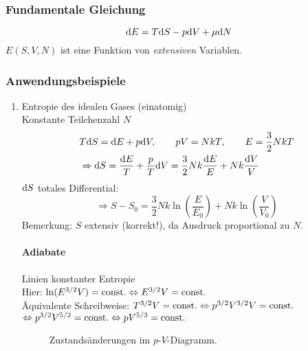 \subsubsection{Fundamentale Gleichung}
\begin{equation}
    \label{eq:fundamentalEQ}
    \mathrm{d} E = T \mathrm{d} S - p \mathrm{d} V + \mu \mathrm{d} N
\end{equation}
$E(S, V, N)$ ist eine Funktion von \emph{extensiven} Variablen.

\subsubsection{Anwendungsbeispiele}
\begin{enumerate}
    \item Entropie des idealen Gases (einatomig) \\
    Konstante Teilchenzahl $N$
    \begin{equation}
        \begin{split}
            & T \mathrm{d} S = \mathrm{d} E + p \mathrm{d} V, \qquad p V = N k T, \qquad E = \frac{3}{2} N k T \\
            & \Rightarrow \mathrm{d} S = \frac{\mathrm{d} E}{T} + \frac{p}{T} \mathrm{d} V = \frac{3}{2} N k \frac{\mathrm{d} E}{E} + N k \frac{\mathrm{d} V}{V}
        \end{split}
    \end{equation}
    $\mathrm{d} S$ totales Differential:
    \begin{equation}
        \Rightarrow S - S_0 = \frac{3}{2} N k \ln (\frac{E}{E_0}) + N k \ln (\frac{V}{V_0})
    \end{equation}
    Bemerkung: $S$ extensiv (korrekt!), da Ausdruck proportional zu $N$.
    \paragraph{Adiabate} Linien konstanter Entropie \\
    Hier: $\ln(E^{3/2} V) = \text{const.} \Leftrightarrow E^{3/2} V = \text{const.}$ \\
    Äquivalente Schreibweise: $T^{3/2} V = \text{const.} \Leftrightarrow p^{3/2} V^{3/2} V = \text{const.}$ \\
    $\Leftrightarrow p^{3/2} V^{5/2} = \text{const.} \Leftrightarrow p V^{5/3} = \text{const.}$
    
        \begin{figure}[H]
        \centering
        \def\svgwidth{0.6\textwidth}
        
        \caption{Zustandsänderungen im $p$-$V$-Diagramm.}
        \label{img:adiabate_pV}
    \end{figure}
    

\end{enumerate}
